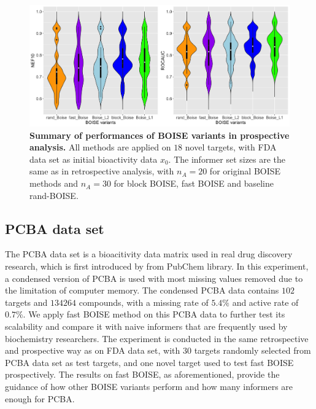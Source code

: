 \documentclass[11pt,a4paper]{article}
\theoremstyle{plain}
\begin{document}
\begin{figure}[!ht]
\centering
\includegraphics[width=5.0in]{Figs/prospective_nef_roc_compar.png}
\caption{\label{fig:prospective_compar} 
{\bf Summary of performances of BOISE variants in prospective analysis.} All methods are applied on $18$ novel targets, with FDA data set as initial bioactivity data $x_0$. The informer set sizes are the same as in retrospective analysis, with $n_A=20$ for original BOISE methods and $n_A = 30$ for block BOISE, fast BOISE and baseline rand-BOISE.}
\end{figure}

\subsection{PCBA data set}
The PCBA data set is a bioacitivity data matrix used in real drug discovery research, which is first introduced by \cite{pcba_Ramsundar_2015} from PubChem library. In this experiment, a condensed version of PCBA is used with most missing values removed due to the limitation of computer memory. The condensed PCBA data contains $102$ targets and $134264$ compounds, with a missing rate of $5.4\%$ and active rate of $0.7\%$. We apply fast BOISE method on this PCBA data to further test its scalability and compare it with naive informers that are frequently used by biochemistry researchers. The experiment is conducted in the same retrospective and prospective way as on FDA data set, with $30$ targets randomly selected from PCBA data set as test targets, and one novel target used to test fast BOISE prospectively. The results on fast BOISE, as aforementioned, provide the guidance of how other BOISE variants perform and how many informers are enough for PCBA.
\end{document}

